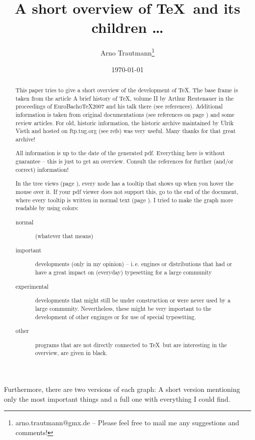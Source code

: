 \documentclass{scrartcl}
\title{A short overview of \TeX\ and its children \dots}
\author{Arno Trautmann\thanks{arno.trautmann@gmx.de – Please feel free to mail me any suggestions and comments!}}
\date{\today}
\begin{document}
\maketitle

\begin{abstract}
This paper tries to give a short overview of the development of \TeX. The base frame is taken from the article \textsf{A brief history of \TeX, volume II} by Arthur Reutenauer in the proceedings of \textsf{EuroBacho\TeX 2007} and his talk there (see references). Additional information is taken from original documentations (see references on page \pageref{sec:refs}) and some review articles. For old, historic information, the \textsf{historic archive} maintained by Ulrik Vieth and hosted on ftp.tug.org (see refs) was very useful. Many thanks for that great archive!

All information is up to the date of the generated pdf. Everything here is without guarantee – this is just to get an overview. Consult the references for further (and/or correct) information!

In the tree views (page \pageref{sec:tree}), every node has a tooltip that shows up when you hover the mouse over it. If your pdf viewer does not support this, go to the end of the document, where every tooltip is written in normal text (page \pageref{sec:text}). I tried to make the graph more readable by using colors:

\begin{description}
\item[{\color[rgb]{\normalimportant} normal}] (whatever that means)
\item[{\color[rgb]{\vip} important}] developments (only in my opinion) – i.\,e. engines or distributions that had or have a great impact on (everyday) typesetting for a large community
\item[{\color[rgb]{\experimental} experimental}] developments that might still be under construction or were never used by a large community. Nevertheless, these might be very important to the development of other enginges or for use of special typesetting. \item[{\color[rgb]{\other} other}] programs that are not directly connected to \TeX\ but are interesting in the overview, are given in black.
\end{description}
\end{abstract}

Furthermore, there are two versions of each graph: A short version mentioning only the most important things and a full one with everything I could find.
\end{document}
